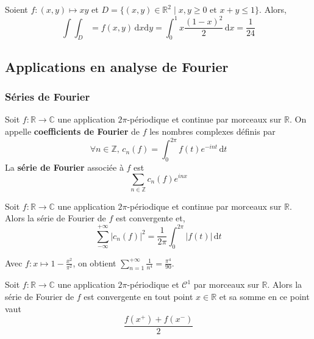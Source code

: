   \begin{example}
    Soient $f : (x,y) \mapsto xy$ et $D = \{ (x,y) \in \mathbb{R}^2 \mid x, y \geq 0 \text{ et } x + y \leq 1 \}$. Alors,
    \[ \int \int_D = f(x,y) \, \mathrm{d}x \mathrm{d}y = \int_0^1 x \frac{(1-x)^2}{2} \, \mathrm{d}x = \frac{1}{24} \]
  \end{example}

	\subsection{Applications en analyse de Fourier}

	\subsubsection{Séries de Fourier}


	\begin{definition}
		Soit $f : \mathbb{R} \rightarrow \mathbb{C}$ une application $2\pi$-périodique et continue par morceaux sur $\mathbb{R}$. On appelle \textbf{coefficients de Fourier} de $f$ les nombres complexes définis par
		\[ \forall n \in \mathbb{Z}, \, c_n(f) = \int_{0}^{2\pi} f(t) e^{-int} \, \mathrm{d}t \]
		La \textbf{série de Fourier} associée à $f$ est
		\[ \sum_{n \in \mathbb{Z}} c_n(f)e^{inx} \]
	\end{definition}

	\begin{theorem}[Parseval]
		Soit $f : \mathbb{R} \rightarrow \mathbb{C}$ une application $2\pi$-périodique et continue par morceaux sur $\mathbb{R}$. Alors la série de Fourier de $f$ est convergente et,
		\[ \sum_{-\infty}^{+\infty} |c_n(f)|^2 = \frac{1}{2\pi} \int_0^{2\pi} |f(t)| \, \mathrm{d}t \]
	\end{theorem}

	\begin{example}
		Avec $f : x \mapsto 1 - \frac{x^2}{\pi^2}$, on obtient $\sum_{n=1}^{+\infty} \frac{1}{n^4} = \frac{\pi^4}{90}$.
	\end{example}

	\begin{theorem}
		Soit $f : \mathbb{R} \rightarrow \mathbb{C}$ une application $2\pi$-périodique et $\mathcal{C}^1$ par morceaux sur $\mathbb{R}$. Alors la série de Fourier de $f$ est convergente en tout point $x \in \mathbb{R}$ et sa somme en ce point vaut
		\[ \frac{f(x^+) + f(x^-)}{2} \]
	\end{theorem}


